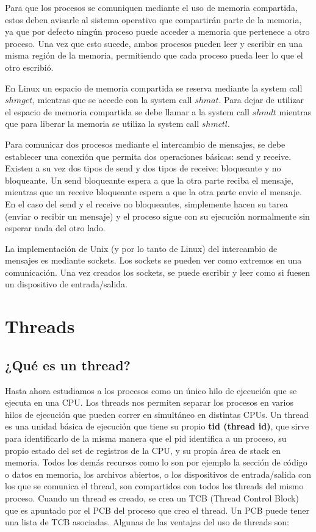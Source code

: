 \documentclass{article}
\begin{document}
Para que los procesos se comuniquen mediante el uso de memoria compartida, estos deben avisarle al sistema operativo que compartir\'an parte de la memoria, ya que por defecto ning\'un proceso puede acceder a memoria que pertenece a otro proceso. Una vez que esto sucede, ambos procesos pueden leer y escribir en una misma regi\'on de la memoria, permitiendo que cada proceso pueda leer lo que el otro escribi\'o.

En Linux un espacio de memoria compartida se reserva mediante la system call $shmget$, mientras que se accede con la system call $shmat$. Para dejar de utilizar el espacio de memoria compartida se debe llamar a la system call $shmdt$ mientras que para liberar la memoria se utiliza la system call $shmctl$.

Para comunicar dos procesos mediante el intercambio de mensajes, se debe establecer una conexi\'on que permita dos operaciones b\'asicas: send y receive. Existen a su vez dos tipos de send y dos tipos de receive: bloqueante y no bloqueante. Un send bloqueante espera a que la otra parte reciba el mensaje, mientras que un receive bloqueante espera a que la otra parte envie el mensaje. En el caso del send y el receive no bloqueantes, simplemente hacen su tarea (enviar o recibir un mensaje) y el proceso sigue con su ejecuci\'on normalmente sin esperar nada del otro lado.

La implementaci\'on de Unix (y por lo tanto de Linux) del intercambio de mensajes es mediante sockets. Los sockets se pueden ver como extremos en una comunicaci\'on. Una vez creados los sockets, se puede escribir y leer como si fuesen un dispositivo de entrada/salida.

\section{Threads}

\subsection{¿Qu\'e es un thread?}

Hasta ahora estudiamos a los procesos como un \'unico hilo de ejecuci\'on que se ejecuta en una CPU. Los threads nos permiten separar los procesos en varios hilos de ejecuci\'on que pueden correr en simult\'aneo en distintas CPUs. Un thread es una unidad b\'asica de ejecuci\'on que tiene su propio \textbf{tid (thread id)}, que sirve para identificarlo de la misma manera que el pid identifica a un proceso, su propio estado del set de registros de la CPU, y su propia \'area de stack en memoria. Todos los dem\'as recursos como lo son por ejemplo la secci\'on de c\'odigo o datos en memoria, los archivos abiertos, o los dispositivos de entrada/salida con los que se comunica el thread, son compartidos con todos los threads del mismo proceso. Cuando un thread es creado, se crea un TCB (Thread Control Block) que es apuntado por el PCB del proceso que creo el thread. Un PCB puede tener una lista de TCB asociadas. Algunas de las ventajas del uso de threads son:
\end{document}
